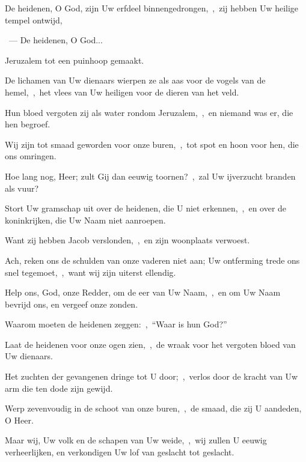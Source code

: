 \documentclass[12pt,twoside,a5paper]{article}
\begin{document}


\begin{halfparskip}

  De heidenen, O God, zijn Uw erfdeel binnengedrongen,~\sep\ zij hebben Uw heilige tempel ontwijd,

  ~---  De heidenen, O God...

  Jeruzalem tot een puinhoop gemaakt.

  De lichamen van Uw dienaars wierpen ze als aas voor de vogels van de hemel,~\sep\ het vlees van Uw heiligen voor de dieren van het veld.

  Hun bloed vergoten zij als water rondom Jeruzalem,~\sep\ en niemand was er, die hen begroef.

  Wij zijn tot smaad geworden voor onze buren,~\sep\ tot spot en hoon voor hen, die ons omringen.
\end{halfparskip}

\begin{halfparskip}

  Hoe lang nog, Heer; zult Gij dan eeuwig toornen?~\sep\ zal Uw ijverzucht branden als vuur?

  Stort Uw gramschap uit over de heidenen, die U niet erkennen,~\sep\ en over de koninkrijken, die Uw Naam niet aanroepen.

  Want zij hebben Jacob verslonden,~\sep\ en zijn woonplaats verwoest.

  Ach, reken ons de schulden van onze vaderen niet aan; Uw ontferming trede ons snel tegemoet,~\sep\ want wij zijn uiterst ellendig.
\end{halfparskip}

\begin{halfparskip}

  Help ons, God, onze Redder, om de eer van Uw Naam,~\sep\ en om Uw Naam bevrijd ons, en vergeef onze zonden.

  Waarom moeten de heidenen zeggen:~\sep\ ``Waar is hun God?''

  Laat de heidenen voor onze ogen zien,~\sep\ de wraak voor het vergoten bloed van Uw dienaars.

  Het zuchten der gevangenen dringe tot U door;~\sep\ verlos door de kracht van Uw arm die ten dode zijn gewijd.

  Werp zevenvoudig in de schoot van onze buren,~\sep\ de smaad, die zij U aandeden, O Heer.

  Maar wij, Uw volk en de schapen van Uw weide,~\sep\ wij zullen U eeuwig verheerlijken, en verkondigen Uw lof van geslacht tot geslacht.
\end{halfparskip}
\end{document}
